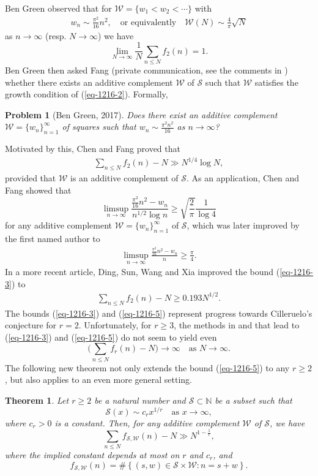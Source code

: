\documentclass[12pt,a4paper,reqno]{amsart}
\numberwithin{equation}{section}
\theoremstyle{plain}
\newtheorem{theorem}{Theorem}
\newtheorem{problem}{Problem}
\theoremstyle{definition}
\begin{document}
Ben Green observed that for 
$
\mathcal{W}=\{w_1<w_2<\cdots\}
$
with
\begin{align}\label{eq-1216-2}
w_n \sim \frac{\pi^2}{16}n^2, \quad \text{or~equivalently} \quad \mathcal{W}(N)\sim \frac{4}{\pi}\sqrt{N}
\end{align}
as $n\rightarrow\infty$ (resp. $N\rightarrow\infty$)
we have
$$
\lim_{N\rightarrow\infty}\frac{1}{N}\sum_{n\le N}f_2(n)=1.
$$
Ben Green then asked Fang (private communication, see the comments in \cite{Chen-Fang}) whether there exists an additive complement $\mathcal{W}$ of $\mathcal{S}$ such that $\mathcal{W}$ satisfies the growth condition of (\ref{eq-1216-2}). Formally,
\begin{problem}[Ben Green, 2017]\label{pro:1}
Does there exist an additive complement $\mathcal{W}=\{w_n\}_{n=1}^{\infty}$ of squares such that 
$w_n \sim \frac{\pi^2 n^2}{16}$ as $n\rightarrow\infty$?
\end{problem}
Motivated by this, Chen and Fang \cite{Chen-Fang} proved that 
\begin{align}\label{eq-1216-3}
\sum_{n\le N}f_2(n)-N\gg N^{1/4}\log N,
\end{align}
provided that $\mathcal{W}$ is an additive complement of $\mathcal{S}$.
As an application, Chen and Fang showed that
$$
\limsup_{n\rightarrow\infty}\frac{\frac{\pi^2}{16}n^2-w_n}{n^{1/2}\log n}\ge \sqrt{\frac{2}{\pi}}\frac{1}{\log 4}
$$
for any additive complement $\mathcal{W}=\{w_n\}_{n=1}^{\infty}$ of $\mathcal{S}$, which was later improved by the first named author \cite{Ding} to
\begin{align*}
\limsup_{n\rightarrow\infty}\frac{\frac{\pi^2}{16}n^2-w_n}{n}\ge \frac{\pi}{4}.
\end{align*}
In a more recent article, Ding, Sun, Wang and Xia \cite{DSWX} improved the bound (\ref{eq-1216-3}) to
\begin{align}\label{eq-1216-5}
\sum_{n\le N}f_2(n)-N\ge 0.193N^{1/2}.
\end{align}
The bounds (\ref{eq-1216-3}) and (\ref{eq-1216-5}) represent progress towards Cilleruelo's conjecture for $r=2$. Unfortunately, for $r\ge 3$, the methods in \cite{Chen-Fang} and \cite{DSWX} that lead to (\ref{eq-1216-3}) and (\ref{eq-1216-5}) do not seem to yield even
$$
\Big(\sum_{n\le N}f_r(n)-N \Big)\rightarrow\infty \quad \text{as }N\rightarrow\infty.
$$
The following new theorem not only extends the bound (\ref{eq-1216-5}) to any $r\ge 2$, but also applies to an even more general setting.

\begin{theorem}\label{thm:1}
Let $r\ge 2$ be a natural number and $\mathscr{S}\subset \mathbb{N}$ be a subset such that
$$
\mathscr{S}(x)\sim c_r x^{1/r} \quad \text{as }x\rightarrow\infty, 
$$
where $c_r>0$ is a constant. Then, for any additive complement $\mathscr{W}$ of $\mathscr{S}$, we have
$$
\sum_{n\le N}f_{\mathscr{S},\mathscr{W}}(n)-N\gg N^{1-\frac{1}{r}},
$$
where the implied constant depends at most on $r$ and $c_r$, and 
$$
f_{\mathscr{S},\mathscr{W}}(n)=\#\left\{(s,w)\in \mathscr{S}\times \mathscr{W}: n=s+w\right\}.
$$
\end{theorem}
\end{document}
